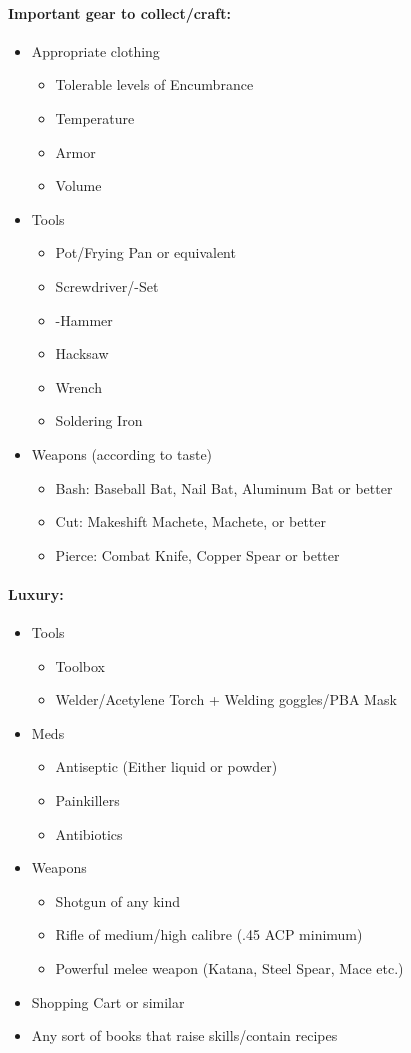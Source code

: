 \paragraph{Important gear to collect/craft:}
\begin{itemize}
\item Appropriate clothing
	\begin{itemize}
	\item Tolerable levels of Encumbrance
	\item Temperature
	\item Armor
	\item Volume
	\end{itemize}
\item Tools
	\begin{itemize}
	\item Pot/Frying Pan or equivalent
	\item Screwdriver/-Set
	\item -Hammer
	\item Hacksaw
	\item Wrench
	\item Soldering Iron
	\end{itemize}
\item Weapons (according to taste)
	\begin{itemize}
	\item Bash: Baseball Bat, Nail Bat, Aluminum Bat or better
	\item Cut: Makeshift Machete, Machete, or better
	\item Pierce: Combat Knife, Copper Spear or better
	\end{itemize}
\end{itemize}

\paragraph{Luxury:}
\begin{itemize}
\item Tools
	\begin{itemize}
	\item Toolbox
	\item Welder/Acetylene Torch + Welding goggles/PBA Mask
	\end{itemize}
\item Meds
	\begin{itemize}
	\item Antiseptic (Either liquid or powder)
	\item Painkillers
	\item Antibiotics
	\end{itemize}
\item Weapons
	\begin{itemize}
	\item Shotgun of any kind
	\item Rifle of medium/high calibre (.45 ACP minimum)
	\item Powerful melee weapon (Katana, Steel Spear, Mace etc.)
	\end{itemize}
\item Shopping Cart or similar
\item Any sort of books that raise skills/contain recipes
\end{itemize}

